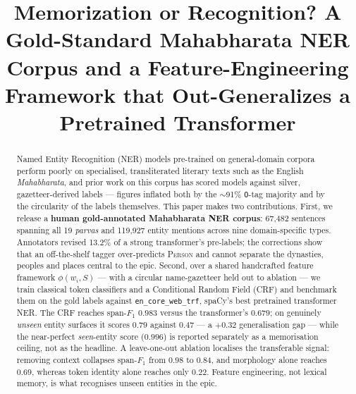 \documentclass[conference]{IEEEtran}
\begin{document}
%
\title{Memorization or Recognition? A Gold-Standard Mahabharata NER Corpus and a Feature-Engineering Framework that Out-Generalizes a Pretrained Transformer
}
%
\author{
}

\maketitle              %

\begin{abstract}
Named Entity Recognition (NER) models pre-trained on general-domain corpora perform poorly on specialised, transliterated literary texts such as the English \emph{Mahabharata}, and prior work on this corpus has scored models against silver, gazetteer-derived labels --- figures inflated both by the $\sim$91\% \texttt{O}-tag majority and by the circularity of the labels themselves. This paper makes two contributions. First, we release a \textbf{human gold-annotated Mahabharata NER corpus}: 67{,}482 sentences spanning all 19 \emph{parvas} and 119{,}927 entity mentions across nine domain-specific types. Annotators revised 13.2\% of a strong transformer's pre-labels; the corrections show that an off-the-shelf tagger over-predicts \textsc{Person} and cannot separate the dynasties, peoples and places central to the epic. Second, over a shared handcrafted feature framework $\phi(w_i,S)$ --- with a circular name-gazetteer held out to ablation --- we train classical token classifiers and a Conditional Random Field (CRF) and benchmark them on the gold labels against \texttt{en\_core\_web\_trf}, spaCy's best pretrained transformer NER. The CRF reaches span-$F_1$ $0.983$ versus the transformer's $0.679$; on genuinely \emph{unseen} entity surfaces it scores $0.79$ against $0.47$ --- a $+0.32$ generalisation gap --- while the near-perfect \emph{seen}-entity score ($0.996$) is reported separately as a memorisation ceiling, not as the headline. A leave-one-out ablation localises the transferable signal: removing context collapses span-$F_1$ from $0.98$ to $0.84$, and morphology alone reaches $0.69$, whereas token identity alone reaches only $0.22$. Feature engineering, not lexical memory, is what recognises unseen entities in the epic.

\end{abstract}
\end{document}
